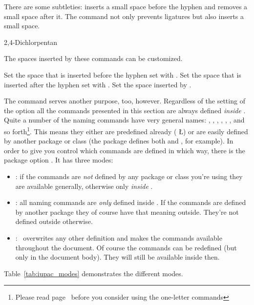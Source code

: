 \documentclass[load-preamble+]{cnltx-doc}
\begin{document}
There are some subtleties: \cs{-} inserts a small space before the hyphen and
removes a small space after it.  The command \cs{\textbar} not only prevents
ligatures but also inserts a small space.
\begin{example}
  \huge{} \par
  2,4-Dichlorpentan
\end{example}

The spaces inserted by these commands can be customized.
\begin{options}
  \Default{.01em}
    Set the space that is inserted before the hyphen set with \cs{-}.
  \Default{-.03em}
    Set the space that is inserted after the hyphen set with \cs{-}.
  \Default{.01em}
    Set the space inserted by \cs{\textbar}.
\end{options}

The command  serves another purpose, too, however.  Regardless of
the setting of the  option all the commands presented in this
section are always defined \emph{inside} .  Quite a number of the
naming commands have very general names: , , , ,
, ,  and so forth\footnote{Please read
  page~\pageref{desc:one-letter-commands} before you consider using the
  one-letter commands}.  This means they either are predefined already (
\L) or are easily defined by another package or class (the  package
defines both  and , for example).  In order to give you control
which commands are defined in which way, there is the package option
\label{desc:iupac}.  It has three modes:
\begin{itemize}
 \item {}: if the commands are \emph{not} defined by any
   package or class you're using they are available generally, otherwise only
   \emph{inside} .
 \item {}: all naming commands are \emph{only} defined
   inside .  If the commands are defined by another package they of
   course have that meaning outside.  They're not defined outside otherwise.
 \item {}: \chemmacros\ overwrites any other definition and
   makes the commands available throughout the document.  Of course the
   commands can be redefined (but only in the document body).  They will still
   be available inside  then.
\end{itemize}
Table~\ref{tab:iupac_modes} demonstrates the different modes.
\end{document}
